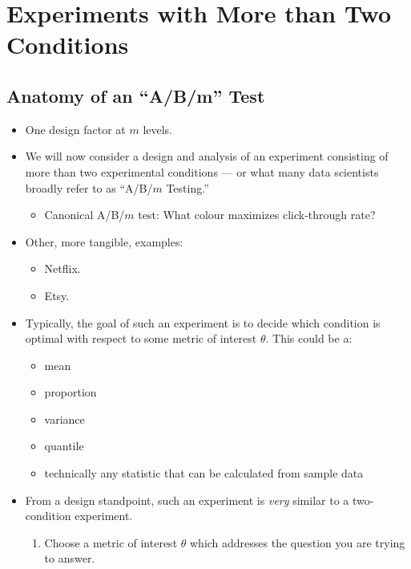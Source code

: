 \chapter{Experiments with More than Two Conditions}
\section*{Anatomy of an ``A/B/m'' Test}
\begin{itemize}
      \item One design factor at $ m $ levels.
      \item We will now consider a design and analysis of an experiment consisting
            of more than two experimental conditions --- or what many data scientists
            broadly refer to as ``A/B/$m$ Testing.''
            \begin{itemize}
                  \item Canonical A/B/$ m $ test: What colour maximizes click-through rate?
            \end{itemize}
      \item Other, more tangible, examples:
            \begin{itemize}
                  \item Netflix.
                  \item Etsy.
            \end{itemize}
      \item Typically, the goal of such an experiment is to decide which condition is
            optimal with respect to some metric of interest $ \theta $. This could be a:
            \begin{itemize}
                  \item mean
                  \item proportion
                  \item variance
                  \item quantile
                  \item technically any statistic that can be calculated from sample data
            \end{itemize}
      \item From a design standpoint, such an experiment is \emph{very} similar to
            a two-condition experiment.
            \begin{enumerate}
                  \item Choose a metric of interest $ \theta $ which addresses the question
                        you are trying to answer.

\end{enumerate}
\end{itemize}
